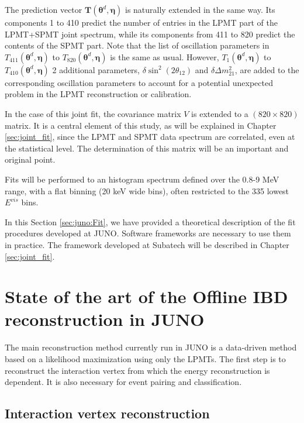 \documentclass[../main.tex]{subfiles}
\begin{document}
The prediction vector $\bm{T}\left(\bm{\theta}^d,\bm{\eta}\right)$ is naturally extended in the same way. Its components 1 to 410 predict the number of entries in the LPMT part of the LPMT+SPMT joint spectrum, while its components from 411 to 820 predict the contents of the SPMT part. Note that the list of oscillation parameters in $T_{411}(\bm{\theta}^d,\bm{\eta})$ to $T_{820}(\bm{\theta}^d,\bm{\eta})$ is the same as usual. However, $T_1(\bm{\theta}^d,\bm{\eta})$ to $T_{410}(\bm{\theta}^d,\bm{\eta})$ 2 additional parameters, $\delta \sin^2(2\theta_{12})$ and $\delta \Delta m^2_{21}$, are added to the corresponding oscillation parameters to account for a potential unexpected problem in the LPMT reconstruction or calibration.

In the case of this joint fit, the covariance matrix $V$ is extended to a $(820 \times 820)$ matrix. It is a central element of this study, as will be explained in Chapter \ref{sec:joint_fit}, since the LPMT and SPMT data spectrum are correlated, even at the statistical level. The determination of this matrix will be an important and original point.

Fits will be performed to an histogram spectrum defined over the 0.8-9 MeV range, with a flat binning (20 keV wide bins), often restricted to the 335 lowest $E^{vis}$ bins.

In this Section \ref{sec:juno:Fit}, we have provided a theoretical description of the fit procedures developed at JUNO. Software frameworks are necessary to use them in practice. The framework developed at Subatech will be described in Chapter \ref{sec:joint_fit}.


\section{State of the art of the Offline IBD reconstruction in JUNO}
\label{sec:juno:reco}

The main reconstruction method currently run in JUNO is a data-driven method based on a likelihood maximization \cite{wu_new_2019, huang_improving_2021} using only the LPMTs. The first step is to reconstruct the interaction vertex from which the energy reconstruction is dependent. It is also necessary for event pairing and classification.

\subsection{Interaction vertex reconstruction}
\end{document}
